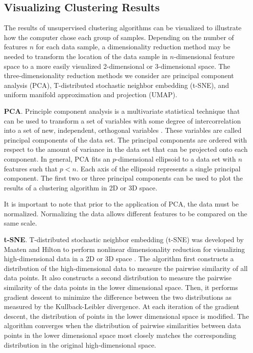 \clearpage

\subsection{Visualizing Clustering Results} 

The results of unsupervised clustering algorithms can be visualized to illustrate how the computer chose each group of samples. Depending on the number of features $n$ for each data sample, a dimensionality reduction method may be needed to transform the location of the data sample in $n$-dimensional feature space to a more easily visualized 2-dimensional or 3-dimensional space. The three-dimensionality reduction methods we consider are principal component analysis (PCA), T-distributed stochastic neighbor embedding (t-SNE), and uniform manifold approximation and projection (UMAP).

\textbf{PCA}. Principle component analysis is a multivariate statistical technique that can be used to transform a set of variables with some degree of intercorrelation into a set of new, independent, orthogonal variables \cite{Abdi2010}. These variables are called principal components of the data set. The principal components are ordered with respect to the amount of variance in the data set that can be projected onto each component. In general, PCA fits an $p$-dimensional ellipsoid to a data set with $n$ features such that $p < n$. Each axis of the ellipsoid represents a single principal component. The first two or three principal components can be used to plot the results of a clustering algorithm in 2D or 3D space.

It is important to note that prior to the application of PCA, the data must be normalized. Normalizing the data allows different features to be compared on the same scale.

\textbf{t-SNE}. T-distributed stochastic neighbor embedding (t-SNE) was developed by Maaten and Hilton to perform nonlinear dimensionality reduction for visualizing high-dimensional data in a 2D or 3D space \cite{Maaten2008}. The algorithm first constructs a distribution of the high-dimensional data to measure the pairwise similarity of all data points. It also constructs a second distribution to measure the pairwise similarity of the data points in the lower dimensional space. Then, it performs gradient descent to minimize the difference between the two distributions as measured by the Kullback-Leibler divergence. At each iteration of the gradient descent, the distribution of points in the lower dimensional space is modified. The algorithm converges when the distribution of pairwise similarities between data points in the lower dimensional space most closely matches the corresponding distribution in the original high-dimensional space.

